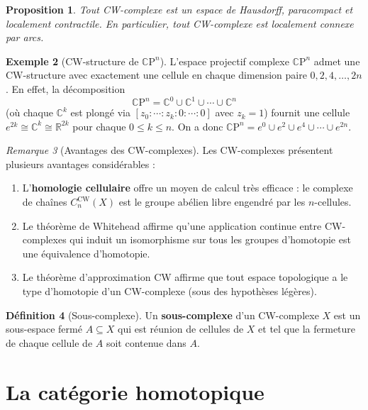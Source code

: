 \documentclass[12pt,a4paper,openany]{book}
\theoremstyle{definition}
\newtheorem{definition}{Définition}[chapter]
\newtheorem{exemple}[definition]{Exemple}
\theoremstyle{plain}
\newtheorem{proposition}[definition]{Proposition}
\theoremstyle{remark}
\newtheorem{remarque}[definition]{Remarque}
\newcommand{\R}{\mathbb{R}}
\newcommand{\C}{\mathbb{C}}
\newcommand{\CP}{\mathbb{C}\mathrm{P}}
\begin{document}
\begin{proposition}\label{prop:CW-proprietes}
Tout CW-complexe est un espace de Hausdorff, paracompact et localement
contractile. En particulier, tout CW-complexe est localement connexe par arcs.
\end{proposition}

\begin{exemple}[CW-structure de $\CP^n$]\label{ex:CW-CPn}
L'espace projectif complexe $\CP^n$ admet une CW-structure avec exactement une
cellule en chaque dimension paire $0, 2, 4, \ldots, 2n$. En effet, la
décomposition
\[
\CP^n = \C^0 \cup \C^1 \cup \cdots \cup \C^n
\]
(où chaque $\C^k$ est plongé via $[z_0 : \cdots : z_k : 0 : \cdots : 0]$ avec
$z_k = 1$) fournit une cellule $e^{2k} \cong \C^k \cong \R^{2k}$ pour chaque
$0 \leqslant k \leqslant n$. On a donc $\CP^n = e^0 \cup e^2 \cup e^4 \cup
\cdots \cup e^{2n}$.
\end{exemple}

\begin{remarque}[Avantages des CW-complexes]\label{rem:avantages-CW}
Les CW-complexes présentent plusieurs avantages considérables :
\begin{enumerate}[label=(\roman*)]
\item L'\textbf{homologie cellulaire} offre un moyen
de calcul très efficace : le complexe de chaînes $C_n^{\mathrm{CW}}(X)$ est le
groupe abélien libre engendré par les $n$-cellules.
\item Le théorème de Whitehead affirme qu'une application continue entre
CW-complexes qui induit un isomorphisme sur tous les groupes d'homotopie est une
équivalence d'homotopie.
\item Le théorème d'approximation CW affirme que tout espace topologique a le
type d'homotopie d'un CW-complexe (sous des hypothèses légères).
\end{enumerate}
\end{remarque}

\begin{definition}[Sous-complexe]\label{def:sous-complexe}
Un \textbf{sous-complexe} d'un CW-complexe $X$ est un sous-espace fermé $A
\subseteq X$ qui est réunion de cellules de $X$ et tel que la fermeture de
chaque cellule de $A$ soit contenue dans $A$.
\end{definition}

\section{La catégorie homotopique}\label{sec:hTop}
\end{document}
